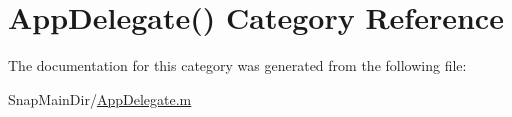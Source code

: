 \hypertarget{category_app_delegate_07_08}{}\section{App\+Delegate() Category Reference}
\label{category_app_delegate_07_08}


The documentation for this category was generated from the following file\+:\begin{DoxyCompactItemize}
\item 
Snap\+Main\+Dir/\hyperlink{_app_delegate_8m}{App\+Delegate.\+m}\end{DoxyCompactItemize}
